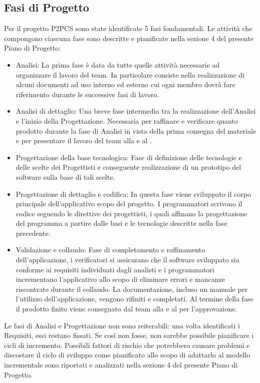 \subsection{Fasi di Progetto}
Per il progetto P2PCS sono state identificate 5 fasi fondamentali. Le attività che compongono ciascuna fase sono descritte e pianificate nella sezione 4 del presente Piano di Progetto:
\begin{itemize}
    \item Analisi: La prima fase è data da tutte quelle attività necessarie ad organizzare il lavoro del team. In particolare consiste nella realizzazione di alcuni documenti ad uso interno ed esterno cui ogni membro dovrà fare riferimento durante le successive fasi di lavoro.
    \item Analisi di dettaglio: Una breve fase intermedia tra la realizzazione dell'Analisi e l'inizio della Progettazione. Necessaria per raffinare e verificare quanto prodotto durante la fase di Analisi in vista della prima consegna del materiale e per presentare il lavoro del team alla  e al .
    \item Progettazione della base tecnologica: Fase di definizione delle tecnologie e delle scelte dei Progettisti e conseguente realizzazione di un prototipo del software sulla base di tali scelte.
    \item Progettazione di dettaglio e codifica: In questa fase viene sviluppato il corpo principale dell'applicativo scopo del progetto. I programmatori scrivono il codice seguendo le direttive dei progettisti, i quali affinano la progettazione del programma a partire dalle basi e le tecnologie descritte nella fase precedente.
    \item Validazione e collaudo: Fase di completamento e raffinamento dell'applicazione, i verificatori si assicurano che il software sviluppato sia conforme ai requisiti individuati dagli analisti e i programmatori incrementano l'applicativo allo scopo di eliminare errori e mancanze riscontrate durante il collaudo. La documentazione, incluso un manuale per l'utilizzo dell'applicazione, vengono rifiniti e completati. Al termine della fase il prodotto finito viene consegnato dal team alla  e al  per l'approvazione.
\end{itemize}
Le fasi di Analisi e Progettazione non sono reiterabili: una volta identificati i Requisiti, essi restano fissati. Se così non fosse, non sarebbe possibile pianificare i cicli di incremento. Possibili fattori di rischio che potrebbero causare problemi e discostare il ciclo di sviluppo come pianificato allo scopo di adattarlo al modello incrementale sono riportati e analizzati nella sezione 4 del presente Piano di Progetto.